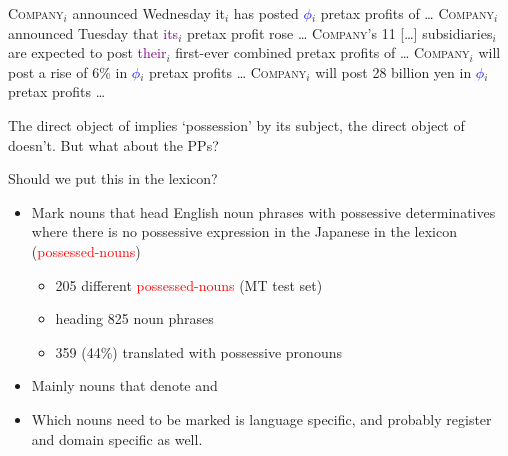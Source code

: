 \documentclass[a4paper,landscape,headrule,footrule,dvips]{foils}
\newcommand{\psp}[1]{\textcolor{purple}{#1}}
\newcommand{\dtr}[1]{\textcolor{blue}{#1}}
\newcommand{\trg}[1]{\textcolor{red}{#1}}
\begin{document}
\begin{CJK}{UTF8}{min}

\begin{exe}
  \ex \textsc{Company}$_i$ announced Wednesday it$_i$ has posted \dtr{$\phi$}$_i$
  pretax profits  
  of \ldots
  \ex \textsc{Company}$_i$ announced Tuesday that \psp{its}$_i$ pretax
  profit rose 
  \ldots
  \ex \textsc{Company}'s 11 [\ldots] subsidiaries$_i$ are expected to
  post \psp{their}$_i$ first-ever combined pretax profits of \ldots 
  \ex  \textsc{Company}$_i$ will  post a rise of 6\% in \dtr{$\phi$}$_i$
  pretax profits 
  \ldots
  \ex  \textsc{Company}$_i$ will  post  28 billion yen in \dtr{$\phi$}$_i$
  pretax profits 
  \ldots  

\end{exe}

The direct object of  implies `possession' by its subject,
the direct object of  doesn't.  But what about the PPs?

Should we put this in the lexicon?




\begin{itemize}
\item Mark nouns that head English noun phrases with possessive
  determinatives where there is no possessive expression in the
  Japanese in the lexicon (\trg{possessed-nouns})
   \begin{itemize}
      \item 205 different \trg{possessed-nouns} (MT test set)
      \item heading 825 noun phrases
      \item 359 (44\%) translated with possessive pronouns
    \end{itemize}
\item  Mainly nouns that denote  and   
\item Which nouns need to be marked is language specific, and probably
  register and domain specific as well.
\end{itemize}
  


\end{CJK}
\end{document}
